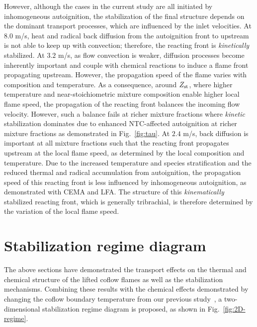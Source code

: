 \documentclass[review,3p,times]{elsarticle}
\begin{document}
However, although the cases in the current study are all initiated by inhomogeneous autoignition, the stabilization of the final structure depends on the dominant transport processes, which are influenced by the inlet velocities.  At $8.0$ m/s, heat and radical back diffusion from the autoignition front to upstream is not able to keep up with convection; therefore, the reacting front is \emph{kinetically} stabilized.  At $3.2$ m/s, \textcolor{cm}{as flow convection is weaker, diffusion processes become inherently important and couple with chemical reactions to induce a flame front propagating upstream.}  However, the propagation speed of the flame varies with composition and temperature.  As a consequence, around $Z_{\rm st}$, where higher temperature and near-stoichiometric mixture composition enable higher local flame speed, the propagation of the reacting front balances the incoming flow velocity.  However, such a balance fails at richer mixture fractions where \emph{kinetic} stabilization dominates due to enhanced NTC-affected autoignition at richer mixture fractions as demonstrated in Fig.~\ref{fig:tau}.  At $2.4$ m/s, back diffusion is important at all mixture fractions such that the reacting front propagates upstream at the local flame speed, as determined by the local composition and temperature.  Due to the increased temperature and species stratification and the reduced thermal and radical accumulation from autoignition, the propagation speed of this reacting front is less influenced by inhomogeneous autoignition, as demonstrated with CEMA and LFA.  The structure of this \emph{kinematically} stabilized reacting front, which is generally tribrachial, is therefore determined by the variation of the local flame speed. 


       
\section{Stabilization regime diagram}

The above sections have demonstrated the transport effects on the thermal and chemical structure of the lifted coflow flames as well as the stabilization mechanisms.  Combining these results with the chemical effects demonstrated by changing the coflow boundary temperature from our previous study~\cite{deng15}, a two-dimensional stabilization regime diagram is proposed, as shown in Fig.~\ref{fig:2D-regime}.   
\end{document}
